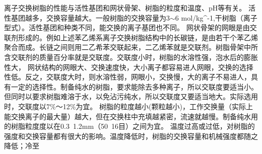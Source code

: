 离子交换树脂的性能与活性基团和网状骨架、树脂的粒度和温度、pH等有关。
 活性基团越多，交换容量越大。一般树脂的交换容量为3$\sim$6 mol/kg^{-1},干树脂（离子型式）。活性基团和种类不同，能交换的离子基团也不同。
网状骨架的网眼是由交联剂形成的。例如上述苯乙烯系离子交换树脂结构中的长碳链，是由若干个苯乙烯聚合而成。长链之间则用二乙希苯交联起来，二乙烯苯就是交联剂。树脂骨架中所含交联剂的质量百分率就是交联度。交联度小时，树脂的水溶性强，泡水后的膨胀性大， 网状结构的网眼大、交换速度快，大小离子都容易进人网眼，交换的选择性低。反之，交联度大时，则水溶性弱，网眼小，交换慢，大的离子不易进人，具有一定的选择性。制备纯水的树脂，要求能除去多种离子，所以交联度要适当小。但同时以要求树脂难溶于水，以免沾污纯水，所以交联度又要适当地大。实际选用时，交联度以7\%～12\%为宜。
树脂的粒度越小(颗粒越小)，工作交换量（实际上能交换离子的最大量）越大，但在交换柱中充填越紧密，流速就越慢。制备纯水用的树脂粒度度以在0.3~1.2mm（50~16目）之间为宜。
温度过高或过低，对树脂的强度和交换容量都有很大的影响。温度降低时，树脂的交换容量和机械强度都随之降低；冷至